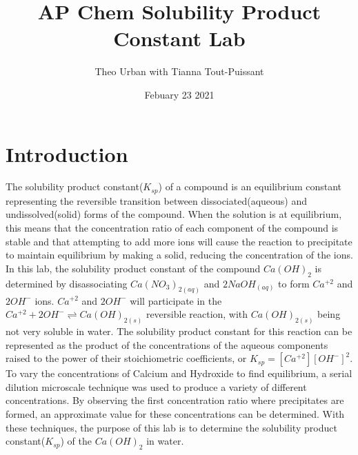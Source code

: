 \documentclass{article}
\title{AP Chem Solubility Product Constant Lab}
\author{Theo Urban with Tianna Tout-Puissant}
\date{Febuary 23 2021}
\begin{document}
\maketitle

\section{Introduction}
    The solubility product constant($K_{sp}$) of a compound is an equilibrium constant representing the reversible transition between dissociated(aqueous) and undissolved(solid) forms of the compound.  When the solution is at equilibrium, this means that the concentration ratio of each component of the compound is stable and that attempting to add more ions will cause the reaction to precipitate to maintain equilibrium by making a solid, reducing the concentration of the ions.  In this lab, the solubility product constant of the compound $Ca(OH)_2$ is determined by disassociating $Ca(NO_3)_{2(aq)}$ and $2NaOH_{(aq)}$ to form $Ca^{+2}$ and $2OH^-$ ions.  $Ca^{+2}$ and $2OH^-$ will participate in the $Ca^{+2}+2OH^- \rightleftharpoons Ca(OH)_{2(s)}$ reversible reaction, with $Ca(OH)_{2(s)}$ being not very soluble in water.  The solubility product constant for this reaction can be represented as the product of the concentrations of the aqueous components raised to the power of their stoichiometric coefficients, or $K_{sp} = [Ca^{+2}][OH^-]^2$.  To vary the concentrations of Calcium and Hydroxide to find equilibrium, a serial dilution microscale technique was used to produce a variety of different concentrations. By observing the first concentration ratio where precipitates are formed, an approximate value for these concentrations can be determined. With these techniques, the purpose of this lab is to determine the solubility product constant($K_{sp}$) of the $Ca(OH)_2$ in water.
\end{document}
